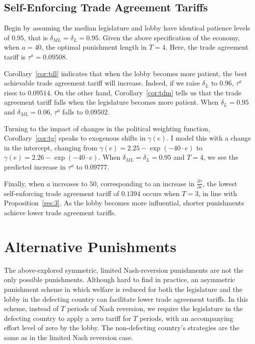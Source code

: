 \documentclass[authoryear, review]{elsarticle}
\newcommand{\ga}{\gamma}
\newcommand{\de}{\delta}
\begin{document}
\subsection{Self-Enforcing Trade Agreement Tariffs}
Begin by assuming the median legislature and lobby have identical patience levels of $0.95$, that is $\de_{ML} = \de_L = 0.95$. Given the above specification of the economy, when $a=40$, the optimal punishment length in $T=4$. Here, the trade agreement tariff is $\tau^a = 0.09508$.

Corollary~\ref{cor:tdl} indicates that when the lobby becomes more patient, the best achievable trade agreement tariff will increase. Indeed, if we raise $\de_L$ to $0.96$, $\tau^a$ rises to $0.09514$. On the other hand, Corollary~\ref{cor:tdm} tells us that the trade agreement tariff falls when the legislature becomes more patient. When $\de_L = 0.95$ and $\de_{ML} = 0.06$, $\tau^a$ falls to $0.09502$.

Turning to the impact of changes in the political weighting function, Corollary~\ref{cor:tg} speaks to exogenous shifts in $\ga(e)$. I model this with a change in the intercept, changing from $\ga(e) = 2.25 - \exp(-40\cdot e)$ to $\ga(e) = 2.26 - \exp(-40\cdot e)$. When $\de_{ML} = \de_L = 0.95$ and $T=4$, we see the predicted increase in $\tau^a$ to $0.09777$.

Finally, when $a$ increases to $50$, corresponding to an increase in $\frac{\partial \ga}{\partial e}$, the lowest self-enforcing trade agreement tariff of $0.1394$ occurs when $T=3$, in line with Proposition~\ref{res:3}. As the lobby becomes more influential, shorter punishments achieve lower trade agreement tariffs.


\section{Alternative Punishments}
\label{sec:asymmetric}
The above-explored symmetric, limited Nash-reversion punishments are not the only possible punishments. Although hard to find in practice, an asymmetric punishment scheme in which welfare is reduced for both the legislature and the lobby in the defecting country can facilitate lower trade agreement tariffs. In this scheme, instead of $T$ periods of Nash reversion, we require the legislature in the defecting country to apply a zero tariff for $T$ periods, with an accompanying effort level of zero by the lobby. The non-defecting country's strategies are the same as in the limited Nash reversion case.
\end{document}
